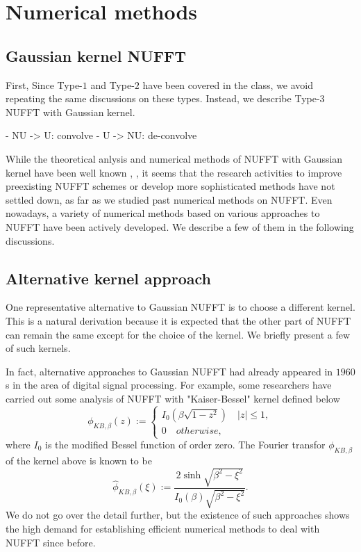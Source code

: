 \section{Numerical methods}


\subsection{Gaussian kernel NUFFT}

First,
Since Type-$1$ and Type-$2$ have been covered in the class, we avoid repeating the same discussions on these types.
Instead, we describe Type-$3$ NUFFT with Gaussian kernel.

- NU -> U: convolve
- U -> NU: de-convolve



While the theoretical anlysis and numerical methods of NUFFT with Gaussian kernel have been well known \cite{SISC-1993-Dutt-Rokhlin}, \cite{SIAM-Rev-2004-Greengard}, it seems that the research activities to improve preexisting NUFFT schemes or develop more sophisticated methods have not settled down, as far as we studied past numerical methods on NUFFT.
Even nowadays, a variety of numerical methods based on various approaches to NUFFT have been actively developed.
We describe a few of them in the following discussions.

\subsection{Alternative kernel approach}
One representative alternative to Gaussian NUFFT is to choose a different kernel.
This is a natural derivation because it is expected that the other part of NUFFT can remain the same except for the choice of the kernel.
We briefly present a few of such kernels.

In fact, alternative approaches to Gaussian NUFFT had already appeared in $1960$s in the area of digital signal processing.
For example, some researchers have carried out some analysis of NUFFT with "Kaiser-Bessel" kernel \cite{Book-Kaiser} defined below
\begin{equation}
  \phi_{KB,\beta}(z) :=
  \begin{cases}
    I_{0}\left(\beta\sqrt{1-z^2}\right) \quad |z| \le 1,\\
    0 \quad otherwise,
  \end{cases}
  \label{eq:KB-kernel}
\end{equation}
where $I_{0}$ is the modified Bessel function of order zero.
The Fourier transfor $\phi_{KB,\beta}$ of the kernel above is known to be
\begin{equation}
  \hat{\phi}_{KB,\beta}(\xi) :=
  \frac{2\sinh\sqrt{\beta^2-\xi^2}}{I_{0}(\beta)\sqrt{\beta^2-\xi^2}}.
  \label{eq:FT-KB-kernel}
\end{equation}
We do not go over the detail further, but the existence of such approaches shows the high demand for establishing efficient numerical methods to deal with NUFFT since before.

